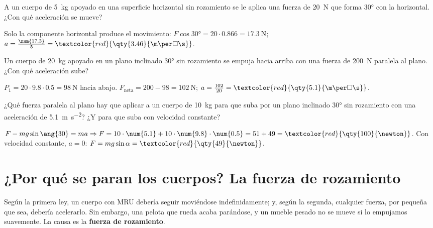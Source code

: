 \begin{exercise}
    A un cuerpo de \qty{5}{\kg} apoyado en una superficie horizontal sin rozamiento se le aplica una fuerza de \qty{20}{\newton} que forma \ang{30} con la horizontal. ¿Con qué aceleración se mueve?
    \begin{solu}
        Solo la componente horizontal produce el movimiento: \(F\cos\ang{30} = 20 \cdot \num{0.866} = \qty{17.3}{\newton}\); \(a = \frac{\num{17.3}}{5} = \textcolor{red}{\qty{3.46}{\m\per\square\s}}\).
    \end{solu}
\end{exercise}

\begin{exercise}
    Un cuerpo de \qty{20}{\kg} apoyado en un plano inclinado \ang{30} sin rozamiento se empuja hacia arriba con una fuerza de \qty{200}{\newton} paralela al plano. ¿Con qué aceleración sube?
    \begin{solu}
        \(P_1 = 20 \cdot \num{9.8} \cdot \num{0.5} = \qty{98}{\newton}\) hacia abajo. \(F_\text{neta} = 200 - 98 = \qty{102}{\newton}\); \(a = \frac{102}{20} = \textcolor{red}{\qty{5.1}{\m\per\square\s}}\).
    \end{solu}
\end{exercise}

\begin{exercise}
    ¿Qué fuerza paralela al plano hay que aplicar a un cuerpo de \qty{10}{\kg} para que suba por un plano inclinado \ang{30} sin rozamiento con una aceleración de \qty{5.1}{\m\per\square\s}? ¿Y para que suba con velocidad constante?
    \begin{solu}
        \(F - m g \sin\ang{30} = m a \Rightarrow F = 10 \cdot \num{5.1} + 10 \cdot \num{9.8} \cdot \num{0.5} = 51 + 49 = \textcolor{red}{\qty{100}{\newton}}\). Con velocidad constante, \(a = 0\): \(F = m g \sin\alpha = \textcolor{red}{\qty{49}{\newton}}\).
    \end{solu}
\end{exercise}

\section{¿Por qué se paran los cuerpos? La fuerza de rozamiento}

Según la primera ley, un cuerpo con MRU debería seguir moviéndose indefinidamente; y, según la segunda, cualquier fuerza, por pequeña que sea, debería acelerarlo. Sin embargo, una pelota que rueda acaba parándose, y un mueble pesado no se mueve si lo empujamos suavemente. La causa es la \textbf{fuerza de rozamiento}.

